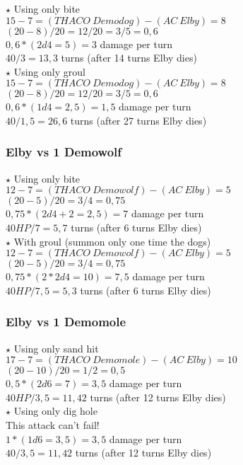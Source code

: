 $\star$ Using only bite\\
$15-7 = (THACO\:Demodog) - (AC\:Elby) = 8$\\
$(20-8)/20 = 12/20 = 3/5 =  0,6$\\
$0,6 * (2d4 = 5) = 3$ damage per turn\\
$40 / 3 = 13,3$ turns (after 14 turns Elby dies)\\
\newline
$\star$ Using only groul\\
$15-7 = (THACO\:Demodog) - (AC\:Elby) = 8$\\
$(20-8)/20 = 12/20 = 3/5 =  0,6$\\
$0,6 * (1d4 = 2,5) = 1,5$ damage per turn\\
$40 / 1,5 = 26,6$ turns (after 27 turns Elby dies)\\

\subsubsection*{Elby vs 1 Demowolf}

$\star$ Using only bite\\
$12-7 = (THACO\:Demowolf) - (AC\:Elby) = 5$\\
$(20-5)/20 = 3/4 = 0,75$\\
$0,75 * (2d4+2 = 2,5) = 7$ damage per turn\\
$40 HP / 7 = 5,7$ turns (after 6 turns Elby dies)\\
\newline
$\star$ With groul (summon only one time the dogs)\\
$12-7 = (THACO\:Demowolf) - (AC\:Elby) = 5$\\
$(20-5)/20 = 3/4 = 0,75$\\
$0,75 * (2*2d4 =10) = 7,5$ damage per turn\\
$40 HP / 7,5 = 5,3$ turns (after 6 turns Elby dies)\\

\subsubsection*{Elby vs 1 Demomole}

$\star$ Using only sand hit\\
$17-7 = (THACO\:Demomole) - (AC\:Elby) = 10$\\
$(20-10)/20 = 1/2 = 0,5$\\
$0,5 * (2d6 = 7) = 3,5$ damage per turn\\
$40 HP / 3,5 = 11,42$ turns (after 12 turns Elby dies)\\
\newline
$\star$ Using only dig hole \\
This attack can’t fail!\\
$1*(1d6 = 3,5) = 3,5$ damage per turn\\
$40 / 3,5 = 11,42$ turns (after 12 turns Elby dies)


